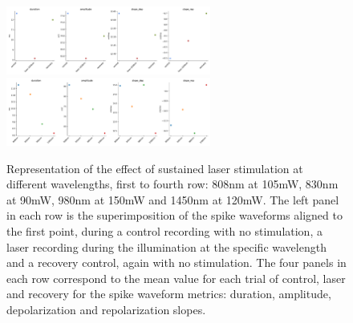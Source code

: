 \begin{figure}[hbt!]
	\includegraphics[width=0.6\textwidth]{img/laser/wavelength/1450nmmetrics.pdf}
	\centering
	\includegraphics[width=0.6\textwidth]{img/laser/wavelength/allmetrics.pdf}
	\caption{Representation of the effect of sustained laser stimulation at different wavelengths, first to fourth row: 808nm at 105mW, 830nm at 90mW, 980nm at 150mW and 1450nm at 120mW. The left panel in each row is the superimposition of the spike waveforms aligned to the first point, during a control recording with no stimulation, a laser recording during the illumination at the specific wavelength and a recovery control, again with no stimulation. The four panels in each row correspond to the mean value for each trial of control, laser and recovery for the spike waveform metrics: duration, amplitude, depolarization and repolarization slopes.}
    \label{fig:wavelengths results}
\end{figure}


